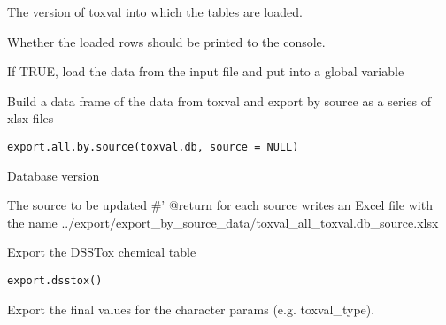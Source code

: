\documentclass[letterpaper]{book}
\begin{document}
%
\begin{Arguments}
\begin{ldescription}
\item[\code{toxval.db}] The version of toxval into which the tables are loaded.

\item[\code{verbose}] Whether the loaded rows should be printed to the console.

\item[\code{do.load}] If TRUE, load the data from the input file and put into a global variable
\end{ldescription}
\end{Arguments}
%
\begin{Description}\relax
Build a data frame of the data from toxval and export by source as a
series of xlsx files
\end{Description}
%
\begin{Usage}
\begin{verbatim}
export.all.by.source(toxval.db, source = NULL)
\end{verbatim}
\end{Usage}
%
\begin{Arguments}
\begin{ldescription}
\item[\code{toxval.db}] Database version

\item[\code{source}] The source to be updated
\#' @return for each source writes an Excel file with the name
../export/export\_by\_source\_data/toxval\_all\_toxval.db\_source.xlsx
\end{ldescription}
\end{Arguments}
%
\begin{Description}\relax
Export the DSSTox chemical table
\end{Description}
%
\begin{Usage}
\begin{verbatim}
export.dsstox()
\end{verbatim}
\end{Usage}
%
\begin{Description}\relax
Export the final values for the character params (e.g. toxval\_type).
\end{Description}
\end{document}
